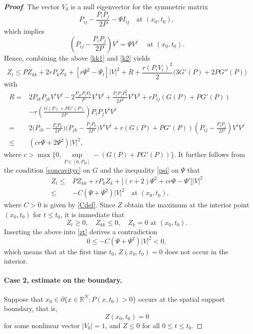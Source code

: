 \documentclass[10pt]{article}         %
\numberwithin{equation}{section}
\begin{document}
\begin{proof}[\bf Proof]
The vector $V_0$ is a null eigenvector for the symmetric  matrix
\[P_{ij}-\frac{P_iP_j}{2P}-\Psi I_{ij}\quad \text{at }(x_0,t_0),\]
which implies
\[(P_{ij}-\frac{P_iP_j}{2P})V^i=\Psi V^j\quad\text{ at }(x_0,t_0).\]
Hence, combining the above \eqref{kk1} and \eqref{k2} yields
\begin{equation*}
Z_t\leq P Z_{kk}+2rP_kZ_k+[r\Psi^2-\Psi_t]|V|^2+R
+\frac{r(P_iV_i)^2}{2}\big(3G'(P)+2PG''(P)\big)
\end{equation*}
with 
\begin{equation*}
    \begin{aligned}
  R=&2P_{ik}P_{jk}V^iV^j-2\frac{P_{jk}P_iP_k}{P}V^iV^j+\frac{P_{i}P_jP_k^2}{2P^2}V^iV^j+rP_{ij}(G(P)+PG'(P))\\
  &-r(\frac{G(P)+PG'(P)}{2P})P_iP_jV^iV^j\\
  =&2\big(P_{ik}-\frac{P_iP_k}{2P}\big)\big(P_{jk}-\frac{P_jP_k}{2P}\big)V^iV^j+r(G(P)+PG'(P))(P_{ij}-\frac{P_iP_j}{2P})V^iV^j\\
  \leq & (cr\Psi+2\Psi^2)|V|^2,
    \end{aligned}
\end{equation*}
where $c>\max\{0, \sup\limits_{P\in[0,P_H]}-(G(P)+PG'(P))\}$.
It further follows from the condition \eqref{concavityc} on $G$ and the inequality \eqref{psi} on $\Psi$ that 
\begin{equation}\label{zt}
\begin{aligned}
Z_t\leq&  PZ_{kk}+rP_kZ_k+\big[(r+2)\Psi^2+cr\Psi-\Psi'\big]|V|^2\\
\leq&- C(\Psi+\Psi^2)|V|^2\quad\text{at }(x_0,t_0),
\end{aligned}
\end{equation}
where $C>0$ is given by \eqref{Cdef}. Since $Z$ obtain the maximum at the interior point $(x_0,t_0)$ for $t\leq t_0$, it is immediate that
\[Z_t\geq 0,\quad Z_{kk}\leq 0,\quad Z_k=0\text{ at }(x_0,t_0).\]
Inserting the above into \eqref{zt} derives a contradiction
\[0\leq -C(\Psi+\Psi^2)|V|^2< 0,\]
which means that at the first time $t_0$, $Z(x_0,t_0)=0$ does not occur in the interior.

\paragraph{Case 2, estimate on the boundary.} Suppose that $x_0\in\partial\{x\in\mathbb{R}^N:P(x,t_0)>0\}$ occurs at the spatial support boundary, that is,
\begin{equation}\label{zb}Z(x_0,t_0)=0\end{equation}
for some nonlinear vector $|V_0|=1$, and $Z\leq 0$ for all $0\leq t\leq t_0$. %


\end{proof}
\end{document}
